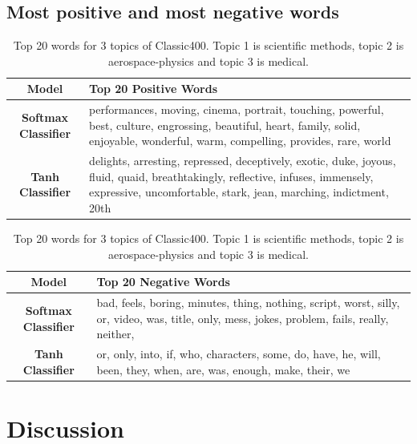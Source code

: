 \documentclass[twoside,12pt]{article}
\begin{document}
\subsection{Most positive and most negative words}


\begin{table}[h!]
\begin{center}
\begin{tabular}{| c | p{12cm} |}
\hline
\textbf{Model}& \textbf{Top 20 Positive Words}  \\ \hline
\textbf{Softmax Classifier} & performances,
moving,
cinema,
portrait,
touching,
powerful,
best,
culture,
engrossing,
beautiful,
heart,
family,
solid,
enjoyable,
wonderful,
warm,
compelling,
provides,
rare,
world\\ \hline
\textbf{Tanh Classifier} &
delights,
arresting,
repressed,
deceptively,
exotic,
duke,
joyous,
fluid,
quaid,
breathtakingly,
reflective,
infuses,
immensely,
expressive,
uncomfortable,
stark,
jean,
marching,
indictment,
20th\\
 \hline
\end{tabular}
\caption{Top 20 words for 3 topics of Classic400. Topic 1 is scientific methods, topic 2 is aerospace-physics and topic 3 is medical.}
\label{tableTopWordsClassic}
\end{center}
\end{table}


\begin{table}[h!]
\begin{center}
\begin{tabular}{| c | p{12cm} |}
\hline
\textbf{Model}& \textbf{Top 20 Negative Words}  \\ \hline
\textbf{Softmax Classifier} &
bad,
feels,
boring,
minutes,
thing,
nothing,
script,
worst,
silly,
or,
video,
was,
title,
only,
mess,
jokes,
problem,
fails,
really,
neither,
 \\ \hline
\textbf{Tanh Classifier} & 
or,
only,
into,
if,
who,
characters,
some,
do,
have,
he,
will,
been,
they,
when,
are,
was,
enough,
make,
their,
we
\\
 \hline
\end{tabular}
\caption{Top 20 words for 3 topics of Classic400. Topic 1 is scientific methods, topic 2 is aerospace-physics and topic 3 is medical.}
\label{tableTopWordsClassic}
\end{center}
\end{table}


\section{Discussion}
\end{document}
